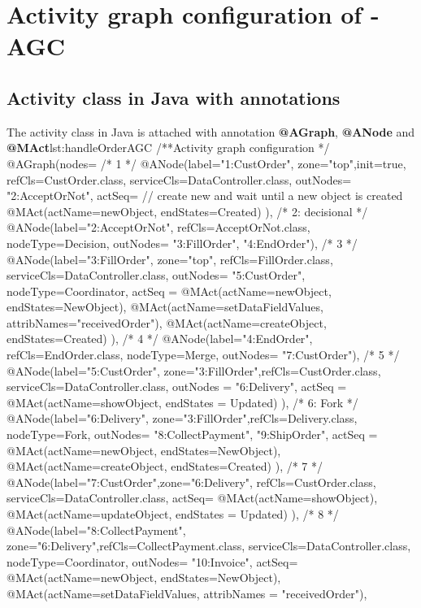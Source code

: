 %
\section{Activity graph configuration of \orderman - AGC} \label{apex:agl-agc}
\subsection{Activity class  in Java with annotations} 
%
\begin{lstcodeplainssm}{The activity class  in Java is attached with annotation \textbf{@AGraph}, \textbf{@ANode} and \textbf{@MAct}}{lst:handleOrderAGC}
/**Activity graph configuration */
@AGraph(nodes={
	/* 1 */    
	@ANode(label="1:CustOrder", zone="top",init=true, 
	refCls=CustOrder.class, serviceCls=DataController.class, 
	outNodes= {"2:AcceptOrNot"},
	actSeq={
		// create new and wait until a new object is created
		@MAct(actName=newObject, endStates={Created})
	}),
	/* 2: decisional */    
	@ANode(label="2:AcceptOrNot", 
	refCls=AcceptOrNot.class, nodeType=Decision, 
	outNodes= {"3:FillOrder", "4:EndOrder"}),
	/* 3 */    
	@ANode(label="3:FillOrder", zone="top", refCls=FillOrder.class, serviceCls=DataController.class,
	outNodes= {"5:CustOrder"},
	nodeType=Coordinator,
	actSeq = {
		@MAct(actName=newObject, endStates={NewObject}),
		@MAct(actName=setDataFieldValues, attribNames={"receivedOrder"}),
		@MAct(actName=createObject, endStates={Created})
	}),
	/* 4 */    
	@ANode(label="4:EndOrder", refCls=EndOrder.class, 
	nodeType=Merge, outNodes= {"7:CustOrder"}),
	/* 5 */    
	@ANode(label="5:CustOrder", zone="3:FillOrder",refCls=CustOrder.class, serviceCls=DataController.class,
	outNodes = {"6:Delivery"},
	actSeq = {
		@MAct(actName=showObject, endStates = {Updated})
	}),
	/* 6: Fork */    
	@ANode(label="6:Delivery", zone="3:FillOrder",refCls=Delivery.class, 
	nodeType=Fork, outNodes= {"8:CollectPayment", "9:ShipOrder"},
	actSeq = {
		@MAct(actName=newObject, endStates={NewObject}),
		@MAct(actName=createObject, endStates={Created})      
	}
	),
	/* 7 */    
	@ANode(label="7:CustOrder",zone="6:Delivery", refCls=CustOrder.class, serviceCls=DataController.class, 
	actSeq={
		@MAct(actName=showObject),
		@MAct(actName=updateObject, endStates = {Updated})
	}),
	/* 8 */    
	@ANode(label="8:CollectPayment", zone="6:Delivery",refCls=CollectPayment.class, 
	serviceCls=DataController.class,
	nodeType=Coordinator,
	outNodes= {"10:Invoice"},
	actSeq={
		@MAct(actName=newObject, endStates={NewObject}),
		@MAct(actName=setDataFieldValues, attribNames = {"receivedOrder"}),
}}
\end{lstcodeplainssm}
